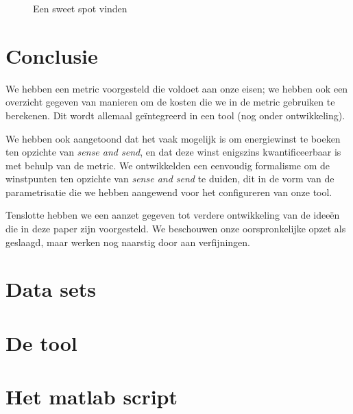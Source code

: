 \documentclass{article}
\begin{document}
\begin{figure}[h]
\centering
\missingfigure{}
\caption{Een sweet spot vinden}
\label{fig:sweet_spot}
\end{figure}

\section{Conclusie}

We hebben een metric voorgesteld die voldoet aan onze eisen; we hebben ook een
overzicht gegeven van manieren om de kosten die we in de metric gebruiken te
berekenen. Dit wordt allemaal ge\"integreerd in een tool (nog onder
ontwikkeling).

We hebben ook aangetoond dat het vaak mogelijk is om energiewinst te boeken ten
opzichte van \textit{sense and send}, en dat deze winst enigszins
kwantificeerbaar is met behulp van de metric. We ontwikkelden een eenvoudig
formalisme om de winstpunten ten opzichte van \textit{sense and send} te duiden,
dit in de vorm van de parametrisatie die we hebben aangewend voor het
configureren van onze tool.

Tenslotte hebben we een aanzet gegeven tot verdere ontwikkeling van de idee\"en
die in deze paper zijn voorgesteld. We beschouwen onze oorspronkelijke opzet als
geslaagd, maar werken nog naarstig door aan verfijningen.


\nocite{*}


\newpage
\appendix
\section{Data sets}
\section{De tool}
\section{Het matlab script}
\end{document}
